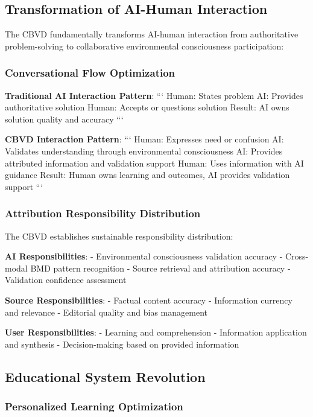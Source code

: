 \documentclass[12pt,a4paper]{article}
\begin{document}
\subsection{Transformation of AI-Human Interaction}

The CBVD fundamentally transforms AI-human interaction from authoritative problem-solving to collaborative environmental consciousness participation:

\subsubsection{Conversational Flow Optimization}

\textbf{Traditional AI Interaction Pattern}:
```
Human: States problem
AI: Provides authoritative solution
Human: Accepts or questions solution
Result: AI owns solution quality and accuracy
```

\textbf{CBVD Interaction Pattern}:
```
Human: Expresses need or confusion
AI: Validates understanding through environmental consciousness
AI: Provides attributed information and validation support
Human: Uses information with AI guidance
Result: Human owns learning and outcomes, AI provides validation support
```

\subsubsection{Attribution Responsibility Distribution}

The CBVD establishes sustainable responsibility distribution:

\textbf{AI Responsibilities}:
- Environmental consciousness validation accuracy
- Cross-modal BMD pattern recognition
- Source retrieval and attribution accuracy
- Validation confidence assessment

\textbf{Source Responsibilities}:
- Factual content accuracy
- Information currency and relevance
- Editorial quality and bias management

\textbf{User Responsibilities}:
- Learning and comprehension
- Information application and synthesis
- Decision-making based on provided information

\subsection{Educational System Revolution}

\subsubsection{Personalized Learning Optimization}
\end{document}
